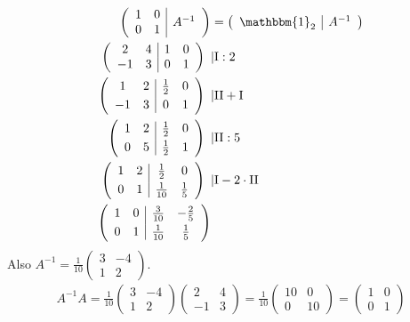 \begin{align*}
	\left(\begin{array}{c|c}
		\begin{matrix}1 & 0\\0 & 1\end{matrix} & A^{-1}
	\end{array}\right) &= \left(\begin{array}{c|c}
		\mathbbm{1}_2 & A^{-1}
	\end{array}\right) \\
	\left(\begin{array}{cc|cc}
		2 & 4 & 1 & 0 \\
		-1 & 3 & 0 & 1
	\end{array}\right)\enspace &|\text{I} : 2 \\
	\left(\begin{array}{cc|cc}
		1 & 2 & \frac{1}{2} & 0 \\[0.3em]
		-1 & 3 & 0 & 1
	\end{array}\right)\enspace &|\text{II} + \text{I} \\
	\left(\begin{array}{cc|cc}
		1 & 2 & \frac{1}{2} & 0 \\[0.3em]
		0 & 5 & \frac{1}{2} & 1
	\end{array}\right)\enspace &|\text{II} : 5 \\
	\left(\begin{array}{cc|cc}
		1 & 2 & \frac{1}{2} & 0 \\[0.3em]
		0 & 1 & \frac{1}{10} & \frac{1}{5}
	\end{array}\right)\enspace &|\text{I} - 2\cdot\text{II} \\
	\left(\begin{array}{cc|cc}
		1 & 0 & \frac{3}{10} & -\frac{2}{5} \\[0.3em]
		0 & 1 & \frac{1}{10} & \frac{1}{5}
	\end{array}\right)
\end{align*}
Also $A^{-1} = \frac{1}{10}\begin{pmatrix}3 & -4 \\1 & 2\end{pmatrix}$.
\begin{align*}
	A^{-1}A = \frac{1}{10}\begin{pmatrix}3 & -4 \\1 & 2\end{pmatrix}\begin{pmatrix}2&4\\-1&3\end{pmatrix} = \frac{1}{10}\begin{pmatrix}10&0\\0&10\end{pmatrix} = \begin{pmatrix}1&0\\0&1\end{pmatrix}
\end{align*}

